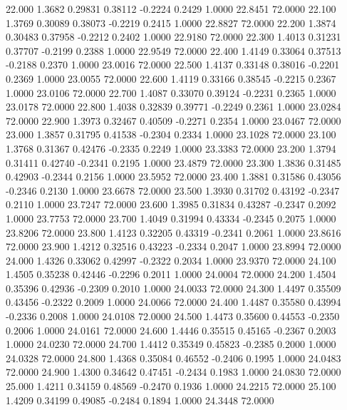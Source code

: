   22.000   1.3682   0.29831   0.38112  -0.2224   0.2429   1.0000  22.8451  72.0000
  22.100   1.3769   0.30089   0.38073  -0.2219   0.2415   1.0000  22.8827  72.0000
  22.200   1.3874   0.30483   0.37958  -0.2212   0.2402   1.0000  22.9180  72.0000
  22.300   1.4013   0.31231   0.37707  -0.2199   0.2388   1.0000  22.9549  72.0000
  22.400   1.4149   0.33064   0.37513  -0.2188   0.2370   1.0000  23.0016  72.0000
  22.500   1.4137   0.33148   0.38016  -0.2201   0.2369   1.0000  23.0055  72.0000
  22.600   1.4119   0.33166   0.38545  -0.2215   0.2367   1.0000  23.0106  72.0000
  22.700   1.4087   0.33070   0.39124  -0.2231   0.2365   1.0000  23.0178  72.0000
  22.800   1.4038   0.32839   0.39771  -0.2249   0.2361   1.0000  23.0284  72.0000
  22.900   1.3973   0.32467   0.40509  -0.2271   0.2354   1.0000  23.0467  72.0000
  23.000   1.3857   0.31795   0.41538  -0.2304   0.2334   1.0000  23.1028  72.0000
  23.100   1.3768   0.31367   0.42476  -0.2335   0.2249   1.0000  23.3383  72.0000
  23.200   1.3794   0.31411   0.42740  -0.2341   0.2195   1.0000  23.4879  72.0000
  23.300   1.3836   0.31485   0.42903  -0.2344   0.2156   1.0000  23.5952  72.0000
  23.400   1.3881   0.31586   0.43056  -0.2346   0.2130   1.0000  23.6678  72.0000
  23.500   1.3930   0.31702   0.43192  -0.2347   0.2110   1.0000  23.7247  72.0000
  23.600   1.3985   0.31834   0.43287  -0.2347   0.2092   1.0000  23.7753  72.0000
  23.700   1.4049   0.31994   0.43334  -0.2345   0.2075   1.0000  23.8206  72.0000
  23.800   1.4123   0.32205   0.43319  -0.2341   0.2061   1.0000  23.8616  72.0000
  23.900   1.4212   0.32516   0.43223  -0.2334   0.2047   1.0000  23.8994  72.0000
  24.000   1.4326   0.33062   0.42997  -0.2322   0.2034   1.0000  23.9370  72.0000
  24.100   1.4505   0.35238   0.42446  -0.2296   0.2011   1.0000  24.0004  72.0000
  24.200   1.4504   0.35396   0.42936  -0.2309   0.2010   1.0000  24.0033  72.0000
  24.300   1.4497   0.35509   0.43456  -0.2322   0.2009   1.0000  24.0066  72.0000
  24.400   1.4487   0.35580   0.43994  -0.2336   0.2008   1.0000  24.0108  72.0000
  24.500   1.4473   0.35600   0.44553  -0.2350   0.2006   1.0000  24.0161  72.0000
  24.600   1.4446   0.35515   0.45165  -0.2367   0.2003   1.0000  24.0230  72.0000
  24.700   1.4412   0.35349   0.45823  -0.2385   0.2000   1.0000  24.0328  72.0000
  24.800   1.4368   0.35084   0.46552  -0.2406   0.1995   1.0000  24.0483  72.0000
  24.900   1.4300   0.34642   0.47451  -0.2434   0.1983   1.0000  24.0830  72.0000
  25.000   1.4211   0.34159   0.48569  -0.2470   0.1936   1.0000  24.2215  72.0000
  25.100   1.4209   0.34199   0.49085  -0.2484   0.1894   1.0000  24.3448  72.0000
